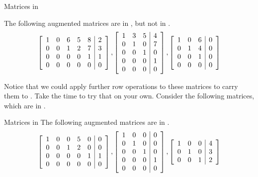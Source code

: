 \begin{example}{Matrices in \EF}\label{exa:matricesnotrref}


The following augmented matrices are in \ef, but not in \rref.
\begin{equation*}
\left[
\begin{array}{rrrrr|r}
1 & 0 & 6 & 5 & 8 & 2 \\
0 & 0 & 1 & 2 & 7 & 3 \\
0 & 0 & 0 & 0 & 1 & 1 \\
0 & 0 & 0 & 0 & 0 & 0
\end{array}
\right] ,\left[
\begin{array}{rrr|r}
1 & 3 & 5 & 4 \\
0 & 1 & 0 & 7 \\
0 & 0 & 1 & 0 \\
0 & 0 & 0 & 1 \\
0 & 0 & 0 & 0
\end{array}
\right], \left[
\begin{array}{rrr|r}
1 & 0 & 6 & 0 \\
0 & 1 & 4 & 0 \\
0 & 0 & 1 & 0 \\
0 & 0 & 0 & 0
\end{array}
\right]
\end{equation*}
\end{example}

Notice that we could apply further row operations to these matrices to carry them to \rref. Take the time to try that on your own. 
Consider the following matrices, which are in \rref. 

\begin{example}{Matrices in\RREF}\label{exa:rrefmatrices}
The following augmented matrices are in \rref.
\begin{equation*}
\left[
\begin{array}{rrrrr|r}
1 & 0 & 0 & 5 & 0 & 0 \\
0 & 0 & 1 & 2 & 0 & 0 \\
0 & 0 & 0 & 0 & 1 & 1 \\
0 & 0 & 0 & 0 & 0 & 0
\end{array}
\right] ,\left[
\begin{array}{rrr|r}
1 & 0 & 0 & 0 \\
0 & 1 & 0 & 0 \\
0 & 0 & 1 & 0 \\
0 & 0 & 0 & 1 \\
0 & 0 & 0 & 0
\end{array}
\right] , \left[
\begin{array}{rrr|r}
1 & 0 & 0 & 4 \\
0 & 1 & 0 & 3 \\
0 & 0 & 1 & 2 
\end{array}
\right]
\end{equation*}
\end{example}

